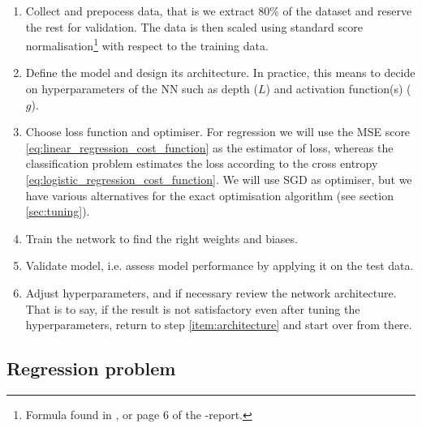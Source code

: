     \begin{enumerate}[label=(\roman*)]
        \item\label{item:prepocess} Collect and prepocess data, that is we extract 80\% of the dataset and reserve the rest for validation. The data is then scaled using standard score normalisation\footnote{Formula found in \cite{mhjensen}, or page 6 of the \projectOne-report.} with respect to the training data.
        \item\label{item:architecture} Define the model and design its architecture. In practice, this means to decide on hyperparameters of the NN such as depth ($L$) and activation function(s) ($g$).
        \item\label{item:optimiser} Choose loss function and optimiser. For regression we will use the MSE score \eqref{eq:linear_regression_cost_function} as the estimator of loss, whereas the classification problem estimates the loss according to the cross entropy \eqref{eq:logistic_regression_cost_function}. We will use SGD as optimiser, but we have various alternatives for the exact optimisation algorithm (see section \ref{sec:tuning}).
        \item\label{item:train} Train the network to find the right weights and biases.
        \item\label{item:assess} Validate model, i.e. assess model performance by applying it on the test data.
        \item\label{item:review} Adjust hyperparameters, and if necessary review the network architecture. That is to say, if the result is not satisfactory even after tuning the hyperparameters, return to step \ref{item:architecture} and start over from there. 
    \end{enumerate}

    

\subsection{Regression problem}\label{sec:analysis_regression}


